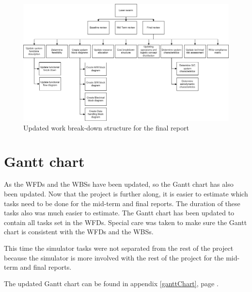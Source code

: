 \begin{figure}
\centering
\includegraphics[width=\textheight, angle=90]{chapters/img/Workbreakdown_structure_FR_v2.png}
\caption{Updated work break-down structure for the final report}
\label{fig:WFfinal2}
\end{figure}

\section{Gantt chart}
\label{Gantt}
As the \acp{WFD} and the \acp{WBS} have been updated, so the Gantt chart has also been updated. 
Now that the project is further along, it is easier to estimate which tasks need to be done for the mid-term and final reports. The duration of these tasks also was much easier to estimate. The Gantt chart has been updated to contain all tasks set in the \ac{WFD}s. Special care was taken to make sure the Gantt chart is consistent with the \acp{WFD} and the \acp{WBS}.

This time the simulator tasks were not separated from the rest of the project because the simulator is more involved with the rest of the project for the mid-term and final reports.

The updated Gantt chart can be found in appendix \ref{ganttChart}, page \pageref{ganttChart}.